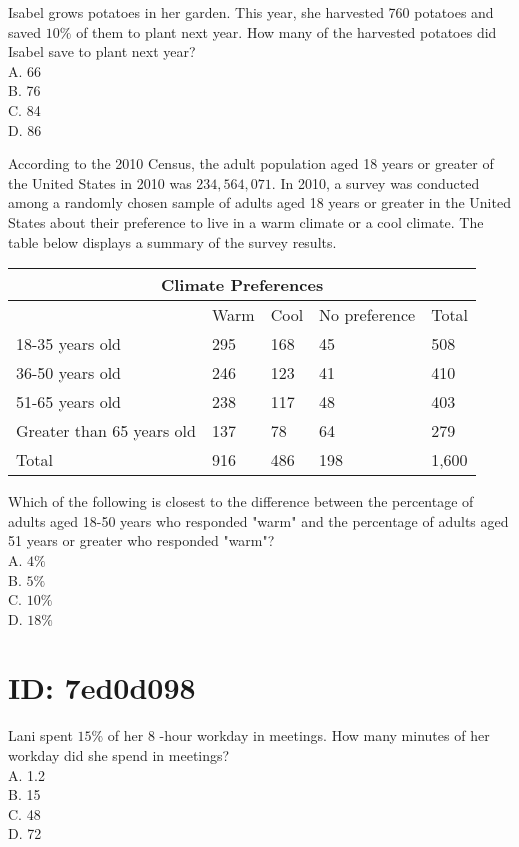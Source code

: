 Isabel grows potatoes in her garden. This year, she harvested 760 potatoes and saved $10 \%$ of them to plant next year. How many of the harvested potatoes did Isabel save to plant next year?\\
A. 66\\
B. 76\\
C. 84\\
D. 86

According to the 2010 Census, the adult population aged 18 years or greater of the United States in 2010 was $234,564,071$. In 2010, a survey was conducted among a randomly chosen sample of adults aged 18 years or greater in the United States about their preference to live in a warm climate or a cool climate. The table below displays a summary of the survey results.

\begin{center}
\begin{tabular}{|l|l|l|l|l|}
\hline
\multicolumn{5}{|c|}{Climate Preferences} \\
\hline
 & Warm & Cool & No preference & Total \\
\hline
18-35 years old & 295 & 168 & 45 & 508 \\
\hline
36-50 years old & 246 & 123 & 41 & 410 \\
\hline
51-65 years old & 238 & 117 & 48 & 403 \\
\hline
Greater than 65 years old & 137 & 78 & 64 & 279 \\
\hline
Total & 916 & 486 & 198 & 1,600 \\
\hline
\end{tabular}
\end{center}

Which of the following is closest to the difference between the percentage of adults aged 18-50 years who responded "warm" and the percentage of adults aged 51 years or greater who responded "warm"?\\
A. $4 \%$\\
B. $5 \%$\\
C. $10 \%$\\
D. $18 \%$

\section*{ID: 7ed0d098}
Lani spent $15 \%$ of her 8 -hour workday in meetings. How many minutes of her workday did she spend in meetings?\\
A. 1.2\\
B. 15\\
C. 48\\
D. 72

